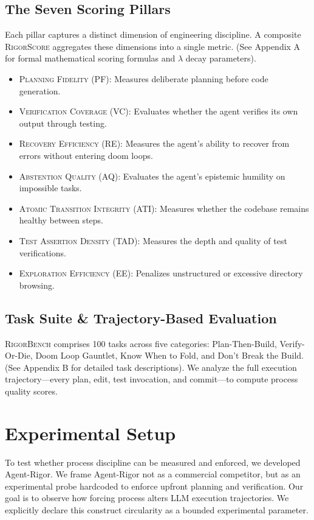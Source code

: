 \documentclass[letterpaper, 10 pt, conference]{ieeeconf}
\newcommand{\bench}{\textsc{RigorBench}}
\newcommand{\rigorscore}{\textsc{RigorScore}}
\newcommand{\pillar}[1]{\textsc{#1}}
\begin{document}
\subsection{The Seven Scoring Pillars}
Each pillar captures a distinct dimension of engineering discipline. A composite \rigorscore{} aggregates these dimensions into a single metric. (See Appendix A for formal mathematical scoring formulas and $\lambda$ decay parameters).
\begin{itemize}[leftmargin=*,itemsep=1pt]
  \item \pillar{Planning Fidelity (PF)}: Measures deliberate planning before code generation.
  \item \pillar{Verification Coverage (VC)}: Evaluates whether the agent verifies its own output through testing.
  \item \pillar{Recovery Efficiency (RE)}: Measures the agent's ability to recover from errors without entering doom loops.
  \item \pillar{Abstention Quality (AQ)}: Evaluates the agent's epistemic humility on impossible tasks.
  \item \pillar{Atomic Transition Integrity (ATI)}: Measures whether the codebase remains healthy between steps.
  \item \pillar{Test Assertion Density (TAD)}: Measures the depth and quality of test verifications.
  \item \pillar{Exploration Efficiency (EE)}: Penalizes unstructured or excessive directory browsing.
\end{itemize}

\subsection{Task Suite \& Trajectory-Based Evaluation}
\bench{} comprises 100 tasks across five categories: Plan-Then-Build, Verify-Or-Die, Doom Loop Gauntlet, Know When to Fold, and Don't Break the Build. (See Appendix B for detailed task descriptions). We analyze the full execution trajectory---every plan, edit, test invocation, and commit---to compute process quality scores. 

\section{Experimental Setup}
To test whether process discipline can be measured and enforced, we developed Agent-Rigor. We frame Agent-Rigor not as a commercial competitor, but as an experimental probe hardcoded to enforce upfront planning and verification. Our goal is to observe how forcing process alters LLM execution trajectories. We explicitly declare this construct circularity as a bounded experimental parameter.
\end{document}
